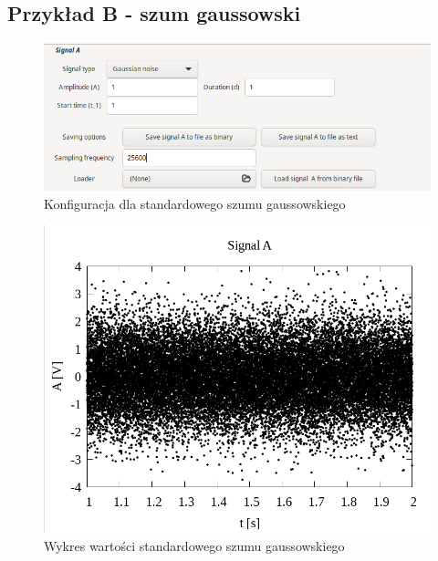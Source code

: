 \documentclass{article}
\begin{document}
\subsection{Przykład B - szum gaussowski}
\begin{figure}[h!]
 \centering
 \includegraphics[width=14cm]{gauss_config.png}
 \vspace{-0.3cm}
 \caption{Konfiguracja dla standardowego szumu gaussowskiego}
 \label{fig:gauss_config}
\end{figure}
\newpage
\begin{figure}[h!]
 \centering
 \includegraphics[width=14cm]{gauss_plot.png}
 \vspace{-0.3cm}
 \caption{Wykres wartości standardowego szumu gaussowskiego}
 \label{fig:gauss_plot}
\end{figure}
\newpage
\end{document}
